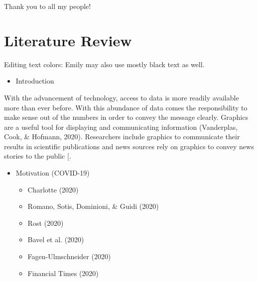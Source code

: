 \documentclass[print]{nuthesis}
\providecommand{\tightlist}{%
  \setlength{\itemsep}{0pt}\setlength{\parskip}{0pt}}
\begin{document}


\begin{acknowledgments}
Thank you to all my people!
\end{acknowledgments}


\tableofcontents

\listoffigures
\listoftables

\mainmatter


\hypertarget{literature-review}{%
\chapter{Literature Review}\label{literature-review}}

Editing text colors:  Emily may also use mostly black text as well.  

\begin{itemize}
\tightlist
\item
  Introduction
\end{itemize}

With the advancement of technology, access to data is more readily available more than ever before.
With this abundance of data comes the responsibility to make sense out of the numbers in order to convey the message clearly.
Graphics are a useful tool for displaying and communicating information (Vanderplas, Cook, \& Hofmann, 2020).
Researchers include graphics to communicate their results in scientific publications and news sources rely on graphics to convey news stories to the public {[}\ear{CITE ME}{]}.

\begin{itemize}
\tightlist
\item
  Motivation (COVID-19)

  \begin{itemize}
  \tightlist
  \item
    Charlotte (2020)
  \item
    Romano, Sotis, Dominioni, \& Guidi (2020)
  \item
    Rost (2020)
  \item
    Bavel et al. (2020)
  \item
    Fagen-Ulmschneider (2020)
  \item
    Financial Times (2020)
  \end{itemize}
\end{itemize}
\end{document}
